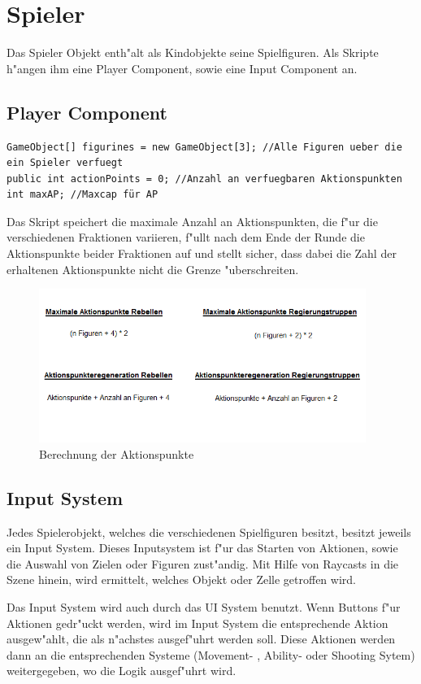\chapter{Spieler}

Das Spieler Objekt enth"alt als Kindobjekte seine Spielfiguren. Als Skripte h"angen ihm eine Player Component, sowie eine Input Component an. 
\section{Player Component}
\begin{lstlisting}[breaklines=true]
GameObject[] figurines = new GameObject[3]; //Alle Figuren ueber die ein Spieler verfuegt
public int actionPoints = 0; //Anzahl an verfuegbaren Aktionspunkten
int maxAP; //Maxcap für AP
\end{lstlisting}
Das Skript speichert die maximale Anzahl an Aktionspunkten, die f"ur die verschiedenen Fraktionen variieren, f"ullt nach dem Ende der Runde die Aktionspunkte beider Fraktionen auf und stellt sicher, dass dabei die Zahl der erhaltenen Aktionspunkte nicht die Grenze "uberschreiten. 

\begin{figure}
	\centering
	\includegraphics[height=5cm]{images/Aktionspunkte.png}
	\caption{Berechnung der Aktionspunkte}
	\label{fig:Aktionspunkte}
\end{figure}

\section{Input System}
Jedes Spielerobjekt, welches die verschiedenen Spielfiguren besitzt, besitzt jeweils ein Input System.
Dieses Inputsystem ist f"ur das Starten von Aktionen, sowie die Auswahl von Zielen oder Figuren zust"andig. Mit Hilfe von Raycasts in die Szene hinein, wird ermittelt, welches Objekt oder Zelle getroffen wird. 

Das Input System wird auch durch das UI System benutzt. Wenn Buttons f"ur Aktionen gedr"uckt werden, wird im Input System die entsprechende Aktion ausgew"ahlt, die als n"achstes ausgef"uhrt werden soll. Diese Aktionen werden dann an die entsprechenden Systeme (Movement- , Ability- oder Shooting Sytem) weitergegeben, wo die Logik ausgef"uhrt wird.